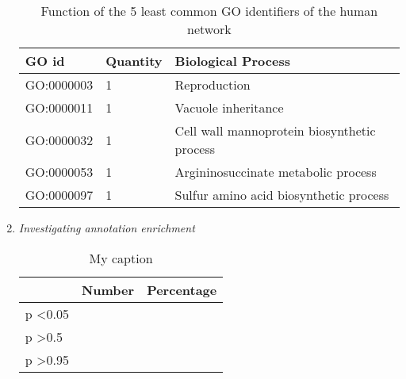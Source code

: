 \documentclass[10pt,a4paper]{article}
\begin{document}
\begin{enumerate}
	
	
	\begin{table}[H]
		\centering
		\caption{Function of the 5 least common GO identifiers of the human network}
		\label{my-label}
		\begin{tabular}{|l|l|l|}
			\hline
			\textbf{GO id} & \textbf{Quantity} & \textbf{Biological Process}                 \\ \hline
			GO:0000003     & 1                 & Reproduction                                \\ \hline
			GO:0000011     & 1                 & Vacuole inheritance                         \\ \hline
			GO:0000032     & 1                 & Cell wall mannoprotein biosynthetic process \\ \hline
			GO:0000053     & 1                 & Argininosuccinate metabolic process         \\ \hline
			GO:0000097     & 1                 & Sulfur amino acid biosynthetic process      \\ \hline
		\end{tabular}
	\end{table}


	\item \textit{Investigating annotation enrichment}
	
	\begin{table}[H]
		\centering
		\caption{My caption}
		\label{my-label}
		\begin{tabular}{|l|l|l|}
			\hline
			& Number & Percentage \\ \hline
			p \textless 0.05    &        &            \\ \hline
			p \textgreater 0.5  &        &            \\ \hline
			p \textgreater 0.95 &        &            \\ \hline
		\end{tabular}
	\end{table}

	


	

\end{enumerate}
\end{document}
